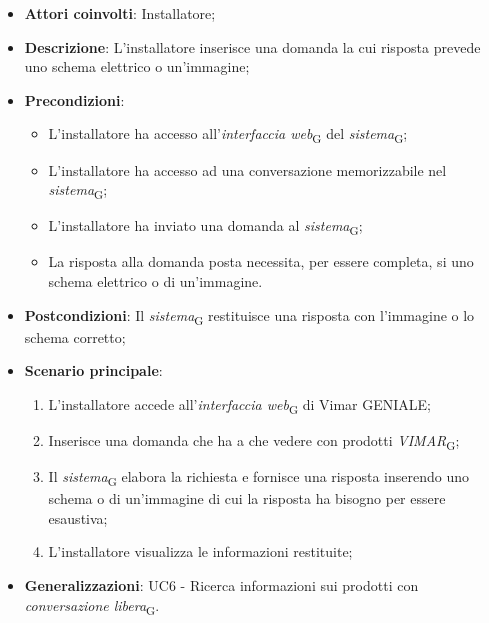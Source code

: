 \begin{itemize}
    \item \textbf{Attori coinvolti}: Installatore;
    \item \textbf{Descrizione}: L’installatore inserisce una domanda la cui risposta prevede uno schema elettrico o un'immagine;
    \item \textbf{Precondizioni}: 
        \begin{itemize}
            \item L’installatore ha accesso all’\textit{interfaccia web}\textsubscript{G} del \textit{sistema}\textsubscript{G};
            \item L’installatore ha accesso ad una conversazione memorizzabile nel \textit{sistema}\textsubscript{G};
            \item L'installatore ha inviato una domanda al \textit{sistema}\textsubscript{G};
            \item La risposta alla domanda posta necessita, per essere completa, si uno schema elettrico o di un'immagine.
        \end{itemize}
    \item \textbf{Postcondizioni}: Il \textit{sistema}\textsubscript{G} restituisce una risposta con l'immagine o lo schema corretto;
    \item \textbf{Scenario principale}:
    \begin{enumerate}
    \item L’installatore accede all’\textit{interfaccia web}\textsubscript{G} di Vimar GENIALE;
    \item Inserisce una domanda che ha a che vedere con prodotti \textit{VIMAR}\textsubscript{G};
    \item Il \textit{sistema}\textsubscript{G} elabora la richiesta e fornisce una risposta inserendo uno schema o di un'immagine di cui la risposta ha bisogno per essere esaustiva;
    \item L’installatore visualizza le informazioni restituite;
    \end{enumerate}
    \item \textbf{Generalizzazioni}: UC6 - Ricerca informazioni sui prodotti con \textit{conversazione libera}\textsubscript{G}.  
\end{itemize}



